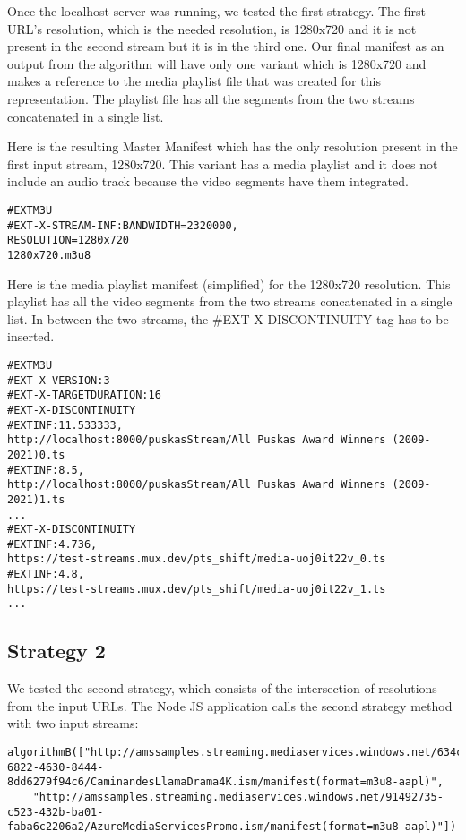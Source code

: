 Once the localhost server was running, we tested the first strategy. The first URL's resolution, which is the needed resolution, is 1280x720 and it is not present in the second stream but it is in the third one. Our final manifest as an output from the algorithm will have only one variant which is 1280x720 and makes a reference to the media playlist file that was created for this representation. The playlist file has all the segments from the two streams concatenated in a single list.

Here is the resulting Master Manifest which has the only resolution present in the first input stream, 1280x720. This variant has a media playlist and it does not include an audio track because the video segments have them integrated.

\begin{lstlisting}
#EXTM3U
#EXT-X-STREAM-INF:BANDWIDTH=2320000,
RESOLUTION=1280x720
1280x720.m3u8
\end{lstlisting}

Here is the media playlist manifest (simplified) for the 1280x720 resolution. This playlist has all the video segments from the two streams concatenated in a single list. In between the two streams, the \#EXT-X-DISCONTINUITY tag has to be inserted.

\begin{lstlisting}
#EXTM3U
#EXT-X-VERSION:3
#EXT-X-TARGETDURATION:16
#EXT-X-DISCONTINUITY
#EXTINF:11.533333,
http://localhost:8000/puskasStream/All Puskas Award Winners (2009-2021)0.ts
#EXTINF:8.5,
http://localhost:8000/puskasStream/All Puskas Award Winners (2009-2021)1.ts
...
#EXT-X-DISCONTINUITY
#EXTINF:4.736,
https://test-streams.mux.dev/pts_shift/media-uoj0it22v_0.ts
#EXTINF:4.8,
https://test-streams.mux.dev/pts_shift/media-uoj0it22v_1.ts
...
\end{lstlisting}

\subsection{Strategy 2}

We tested the second strategy, which consists of the intersection of resolutions from the input URLs. The Node JS application calls the second strategy method with two input streams: 

\begin{lstlisting}
algorithmB(["http://amssamples.streaming.mediaservices.windows.net/634cd01c-6822-4630-8444-8dd6279f94c6/CaminandesLlamaDrama4K.ism/manifest(format=m3u8-aapl)", 
    "http://amssamples.streaming.mediaservices.windows.net/91492735-c523-432b-ba01-faba6c2206a2/AzureMediaServicesPromo.ism/manifest(format=m3u8-aapl)"])
\end{lstlisting}

